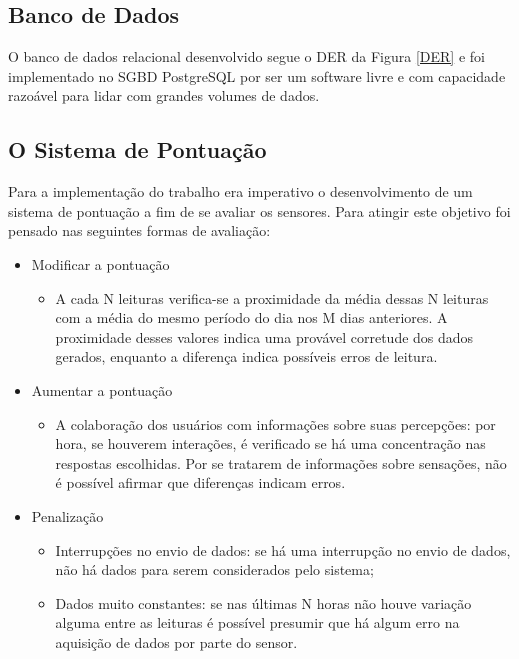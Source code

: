 \subsection{Banco de Dados}
\null \quad O banco de dados relacional desenvolvido segue o \acrfull{DER} da Figura \ref{DER} e foi implementado no \acrfull{SGBD} PostgreSQL por ser um software livre e com capacidade razoável para lidar com grandes volumes de dados.

\newpage
\subsection{O Sistema de Pontuação}
\null \quad Para a implementação do trabalho era imperativo o desenvolvimento de um sistema de pontuação a fim de se avaliar os sensores. Para atingir este objetivo foi pensado nas seguintes formas de avaliação:
\begin{itemize}
  \item Modificar a pontuação
    \begin{itemize}
      \item A cada N leituras verifica-se a proximidade da média dessas N leituras com a média do mesmo período do dia nos M dias anteriores. A proximidade desses valores indica uma provável corretude dos dados gerados, enquanto a diferença indica possíveis erros de leitura.
    \end{itemize}
  \item Aumentar a pontuação
  \begin{itemize}
    \item A colaboração dos usuários com informações sobre suas percepções: por hora, se houverem interações, é verificado se há uma concentração nas respostas escolhidas. Por se tratarem de informações sobre sensações, não é possível afirmar que diferenças indicam erros.
  \end{itemize}
  \item Penalização
    \begin{itemize}
      \item Interrupções no envio de dados: se há uma interrupção no envio de dados, não há dados para serem considerados pelo sistema;
      \item Dados muito constantes: se nas últimas N horas não houve variação alguma entre as leituras é possível presumir que há algum erro na aquisição de dados por parte do sensor.
    \end{itemize}
\end{itemize}

